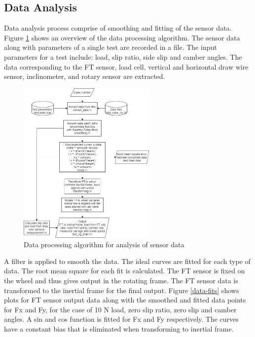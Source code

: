 \documentclass{article}
\begin{document}
\subsection{Data Analysis}
Data analysis process comprise of smoothing and fitting of the sensor data. Figure \ref{fig:data-processing-algorithm} shows an overview of the data processing algorithm. The sensor data along with parameters of a single test are recorded in a file. The input parameters for a test include: load, slip ratio, side slip and camber angles. The data corresponding to the FT sensor, load cell, vertical and horizontal draw wire sensor, inclinometer, and rotary sensor are extracted. 

\begin{figure}[hbt!]
\centering
\includegraphics[width=0.6\textwidth]{general-images/test_rig_data_analysis.png}
\caption{Data processing algorithm for analysis of sensor data}
\label{fig:data-processing-algorithm}
\end{figure}

A filter is applied to smooth the data. The ideal curves are fitted for each type of data. The root mean square for each fit is calculated. The FT sensor is fixed on the wheel and thus gives output in the rotating frame. The FT sensor data is transformed to the inertial frame for the final output. Figure \ref{data-fits} shows plots for FT sensor output data along with the smoothed and fitted data points for Fx and Fy, for the case of 10 N load, zero slip ratio, zero slip and camber angles. A sin and cos function is fitted for Fx and Fy respectively. The curves have a constant bias that is eliminated when transforming to inertial frame.  
\end{document}
